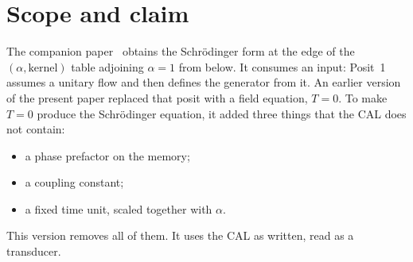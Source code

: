 \documentclass[11pt]{amsart}
\theoremstyle{definition}
\theoremstyle{remark}
\begin{document}
\begin{abstract}
\begin{itemize}
\begin{itemize}
\item Braking together with a fading past can settle the growth. Braking alone cannot, which is integral windup.
\end{itemize}
\item \emph{Memory, loss and Markov structure.}
\begin{itemize}
\item A normalizable memory has no undamped mode. The power law escapes because its total weight is infinite.
\item The edge is Markov through the fundamental theorem of calculus.
\item Information loss is contraction from rank $2$ to rank $1$. It is absent in the free edge and present in interaction and readout.
\end{itemize}
\end{itemize}

The structural results are kept. The edge is Galilean and carries no interaction. One carrier $J\in M_2(\mathbb C)$ is two factors, whose concurrence is $1/\gamma$ of its current. The trace readout survives tensor composition.

Numerical runs of the iterated law confirm each statement.
\end{abstract}

\maketitle
\tableofcontents

\section{Scope and claim}

The companion paper~\cite{Skeleton} obtains the Schr\"odinger form at the edge of the $(\alpha,\text{kernel})$ table adjoining $\alpha=1$ from below. It consumes an input: Posit~1 assumes a unitary flow and then defines the generator from it. An earlier version of the present paper replaced that posit with a field equation, $T=0$. To make $T=0$ produce the Schr\"odinger equation, it added three things that the CAL does not contain:
\begin{itemize}
\item a phase prefactor on the memory;
\item a coupling constant;
\item a fixed time unit, scaled together with $\alpha$.
\end{itemize}
This version removes all of them. It uses the CAL as written, read as a transducer.
\end{document}
